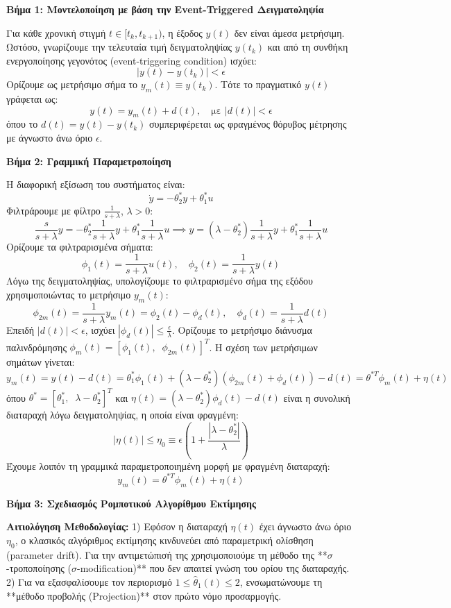 \documentclass[a4paper,11pt]{article}
\begin{document}
\begin{answer}
\textbf{Βήμα 1: Μοντελοποίηση με βάση την Event-Triggered Δειγματοληψία}

Για κάθε χρονική στιγμή $t \in [t_k, t_{k+1})$, η έξοδος $y(t)$ δεν είναι άμεσα μετρήσιμη. Ωστόσο, γνωρίζουμε την τελευταία τιμή δειγματοληψίας $y(t_k)$ και από τη συνθήκη ενεργοποίησης γεγονότος (event-triggering condition) ισχύει:
\[ |y(t) - y(t_k)| < \epsilon \]
Ορίζουμε ως μετρήσιμο σήμα το $y_m(t) \equiv y(t_k)$. Τότε το πραγματικό $y(t)$ γράφεται ως:
\[ y(t) = y_m(t) + d(t), \quad \text{με } |d(t)| < \epsilon \]
όπου το $d(t) = y(t) - y(t_k)$ συμπεριφέρεται ως φραγμένος θόρυβος μέτρησης με άγνωστο άνω όριο $\epsilon$.

\textbf{Βήμα 2: Γραμμική Παραμετροποίηση}

Η διαφορική εξίσωση του συστήματος είναι:
\[ \dot{y} = -\theta_2^* y + \theta_1^* u \]
Φιλτράρουμε με φίλτρο $\frac{1}{s+\lambda}$, $\lambda > 0$:
\[ \frac{s}{s+\lambda} y = -\theta_2^* \frac{1}{s+\lambda} y + \theta_1^* \frac{1}{s+\lambda} u \implies y = (\lambda - \theta_2^*) \frac{1}{s+\lambda} y + \theta_1^* \frac{1}{s+\lambda} u \]
Ορίζουμε τα φιλτραρισμένα σήματα:
\[ \phi_1(t) = \frac{1}{s+\lambda} u(t), \quad \phi_2(t) = \frac{1}{s+\lambda} y(t) \]
Λόγω της δειγματοληψίας, υπολογίζουμε το φιλτραρισμένο σήμα της εξόδου χρησιμοποιώντας το μετρήσιμο $y_m(t)$:
\[ \phi_{2m}(t) = \frac{1}{s+\lambda} y_m(t) = \phi_2(t) - \phi_d(t), \quad \phi_d(t) = \frac{1}{s+\lambda} d(t) \]
Επειδή $|d(t)| < \epsilon$, ισχύει $|\phi_d(t)| \le \frac{\epsilon}{\lambda}$.
Ορίζουμε το μετρήσιμο διάνυσμα παλινδρόμησης $\phi_m(t) = [\phi_1(t), \;\; \phi_{2m}(t)]^T$.
Η σχέση των μετρήσιμων σημάτων γίνεται:
\[ y_m(t) = y(t) - d(t) = \theta_1^* \phi_1(t) + (\lambda - \theta_2^*) (\phi_{2m}(t) + \phi_d(t)) - d(t) = \theta^{*T} \phi_m(t) + \eta(t) \]
όπου $\theta^* = [\theta_1^*, \;\; \lambda - \theta_2^*]^T$ και $\eta(t) = (\lambda - \theta_2^*) \phi_d(t) - d(t)$ είναι η συνολική διαταραχή λόγω δειγματοληψίας, η οποία είναι φραγμένη:
\[ |\eta(t)| \le \eta_0 \equiv \epsilon \left( 1 + \frac{|\lambda - \theta_2^*|}{\lambda} \right) \]
Έχουμε λοιπόν τη γραμμικά παραμετροποιημένη μορφή με φραγμένη διαταραχή:
\[ y_m(t) = \theta^{*T} \phi_m(t) + \eta(t) \]

\textbf{Βήμα 3: Σχεδιασμός Ρομποτικού Αλγορίθμου Εκτίμησης}

\textbf{Αιτιολόγηση Μεθοδολογίας:}
1) Εφόσον η διαταραχή $\eta(t)$ έχει άγνωστο άνω όριο $\eta_0$, ο κλασικός αλγόριθμος εκτίμησης κινδυνεύει από παραμετρική ολίσθηση (parameter drift). Για την αντιμετώπισή της χρησιμοποιούμε τη μέθοδο της **$\sigma$-τροποποίησης ($\sigma$-modification)** που δεν απαιτεί γνώση του ορίου της διαταραχής.
2) Για να εξασφαλίσουμε τον περιορισμό $1 \le \hat{\theta}_1(t) \le 2$, ενσωματώνουμε τη **μέθοδο προβολής (Projection)** στον πρώτο νόμο προσαρμογής.


\end{answer}
\end{document}
